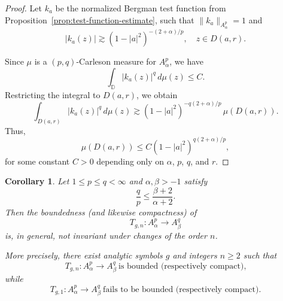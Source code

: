 \documentclass[preprint,12pt]{elsarticle}
\numberwithin{equation}{section}
\newtheorem{corollary}{Corollary}[section]
\theoremstyle{remark}
\begin{document}
\begin{proof}
Let $k_a$ be the normalized Bergman test function from Proposition~\ref{prop:test-function-estimate},
such that $\|k_a\|_{A_\alpha^p}=1$ and
\begin{equation*}
|k_a(z)| \gtrsim (1-|a|^2)^{-(2+\alpha)/p}, \quad z\in D(a,r).
\end{equation*}

Since $\mu$ is a $(p,q)$-Carleson measure for $A_\alpha^p$, we have
\begin{equation*}
\int_{\mathbb{D}} |k_a(z)|^q \, d\mu(z) \le C.
\end{equation*}
Restricting the integral to $D(a,r)$, we obtain
\begin{equation*}
\int_{D(a,r)} |k_a(z)|^q \, d\mu(z)
\gtrsim (1-|a|^2)^{-q(2+\alpha)/p} \, \mu(D(a,r)).
\end{equation*}
Thus,
\begin{equation*}
\mu(D(a,r))
\le C (1-|a|^2)^{q(2+\alpha)/p},
\end{equation*}
for some constant $C>0$ depending only on $\alpha$, $p$, $q$, and $r$.
\end{proof}

\begin{corollary}\label{cor:not_invariant_n}
Let $1\le p\le q<\infty$ and $\alpha,\beta>-1$ satisfy
\begin{equation*}
\frac{q}{p}\le \frac{\beta+2}{\alpha+2}.
\end{equation*}
Then the boundedness (and likewise compactness) of
\begin{equation*}
T_{g,n}:A_\alpha^p\to A_\beta^q
\end{equation*}
is, in general, not invariant under changes of the order $n$.

More precisely, there exist analytic symbols $g$ and integers $n\ge2$ such that
\begin{equation*}
T_{g,n}:A_\alpha^p\to A_\beta^q \ \text{is bounded (respectively compact),}
\end{equation*}
while
\begin{equation*}
T_{g,1}:A_\alpha^p\to A_\beta^q \ \text{fails to be bounded (respectively compact).}
\end{equation*}
\end{corollary}
\end{document}
